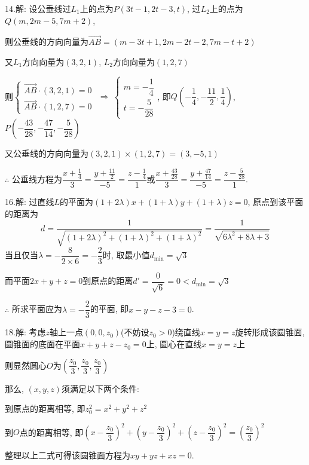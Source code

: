   14.解: 设公垂线过$L_1$上的点为$P \left( 3t-1,2t-3,t \right)$, 过$L_2$上的点为$Q \left( m,2m-5,7m+2 \right)$,

  则公垂线的方向向量为$\overrightarrow{AB} = \left( m-3t+1,2m-2t-2,7m-t+2 \right)$

  又$L_1$方向向量为$\left( 3,2,1 \right)$, $L_2$方向向量为$\left( 1,2,7 \right)$

  则$\begin{cases}
  \overrightarrow{AB} \cdot \left( 3,2,1 \right) = 0 \\
  \overrightarrow{AB} \cdot \left( 1,2,7 \right) = 0
  \end{cases}$
  $\Rightarrow~\begin{cases} m = - \dfrac{1}{4} \\ t = - \dfrac{5}{28} \end{cases}$, 即$Q \left( -\dfrac{1}{4},-\dfrac{11}{2},\dfrac{1}{4} \right)$, $P \left( -\dfrac{43}{28},-\dfrac{47}{14},-\dfrac{5}{28} \right)$

  又公垂线的方向向量为$\left( 3,2,1 \right) \times \left( 1,2,7 \right) = \left( 3,-5,1 \right)$

  $\therefore$ 公垂线方程为$\dfrac{x+\frac{1}{4}}{3} = \dfrac{y+\frac{11}{2}}{-5} = \dfrac{z-\frac{1}{4}}{1}$或$\dfrac{x+\frac{43}{28}}{3} = \dfrac{y+\frac{47}{14}}{-5} = \dfrac{z-\frac{5}{28}}{1}$.

  16.解: 过直线$L$的平面为$(1+2\lambda)x + (1+\lambda)y + (1+\lambda)z = 0$, 原点到该平面的距离为
  $$d = \dfrac{1}{\sqrt{\left( 1+2\lambda \right)^2 + \left( 1+\lambda \right)^2 + \left( 1+\lambda \right)^2}}=\dfrac{1}{\sqrt{6\lambda^2 + 8\lambda + 3}}$$
  当且仅当$\lambda = -\dfrac{8}{2 \times 6} = - \dfrac{2}{3}$时, 取最小值$d_{\min} = \sqrt{3}$

  而平面$2x+y+z=0$到原点的距离$d'=\dfrac{0}{\sqrt{6}} = 0 < d_{\min} = \sqrt{3}$

  $\therefore$ 所求平面应为$\lambda = -\dfrac{2}{3}$的平面, 即$x-y-z-3=0$.

  18.解: 考虑$z$轴上一点$\left( 0,0,z_0 \right)$(不妨设$z_0>0$)绕直线$x=y=z$旋转形成该圆锥面, 圆锥面的底面在平面$x+y+z-z_0=0$上, 圆心在直线$x=y=z$上

  则显然圆心$O$为$\left( \dfrac{z_0}{3},\dfrac{z_0}{3},\dfrac{z_0}{3} \right)$

  那么, $\left( x,y,z \right)$须满足以下两个条件:

   到原点的距离相等, 即$z_0^2 = x^2+y^2+z^2$

   到$O$点的距离相等, 即$\left( x-\dfrac{z_0}{3} \right)^2 + \left( y-\dfrac{z_0}{3} \right)^2 + \left( z-\dfrac{z_0}{3} \right)^2 = \left( \dfrac{z_0}{3} \right)^2$

  整理以上二式可得该圆锥面方程为$xy+yz+xz=0$.